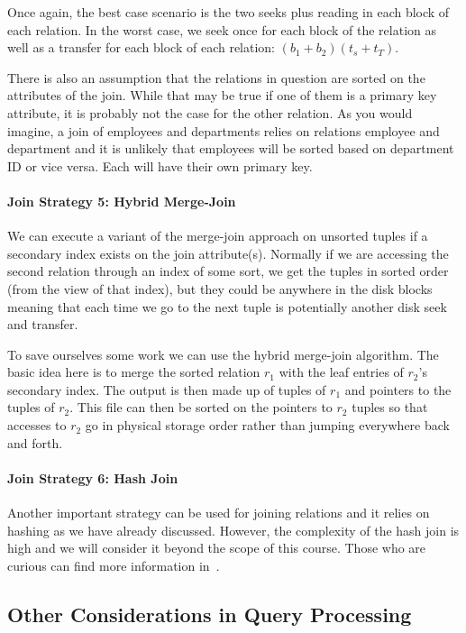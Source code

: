 Once again, the best case scenario is the two seeks plus reading in each block of each relation. In the worst case, we  seek once for each block of the relation as well as a transfer for each block of each relation: $(b_{1} + b_{2})(t_{s} + t_{T})$.

There is also an assumption that the relations in question are sorted on the attributes of the join. While that may be true if one of them is a primary key attribute, it is probably not the case for the other relation. As you would imagine, a join of employees and departments relies on relations employee and department and it is unlikely that employees will be sorted based on department ID or vice versa. Each will have their own primary key. 

\paragraph{Join Strategy 5: Hybrid Merge-Join}

We can execute a variant of the merge-join approach on unsorted tuples if a secondary index exists on the join attribute(s). Normally if we are accessing the second relation through an index of some sort, we get the tuples in sorted order (from the view of that index), but they could be anywhere in the disk blocks meaning that each time we go to the next tuple is potentially another disk seek and transfer.

To save ourselves some work we can use the hybrid merge-join algorithm. The basic idea here is to merge the sorted relation $r_{1}$ with the leaf entries of $r_{2}$'s secondary index. The output is then made up of tuples of $r_{1}$ and pointers to the tuples of $r_{2}$. This file can then be sorted on the pointers to $r_{2}$ tuples so that accesses to $r_{2}$ go in physical storage order rather than jumping everywhere back and forth.

\paragraph{Join Strategy 6: Hash Join}
Another important strategy can be used for joining relations and it relies on hashing as we have already discussed. However, the complexity of the hash join is high and we will consider it beyond the scope of this course. Those who are curious can find more information in~\cite{dsc}.

\subsection*{Other Considerations in Query Processing}

